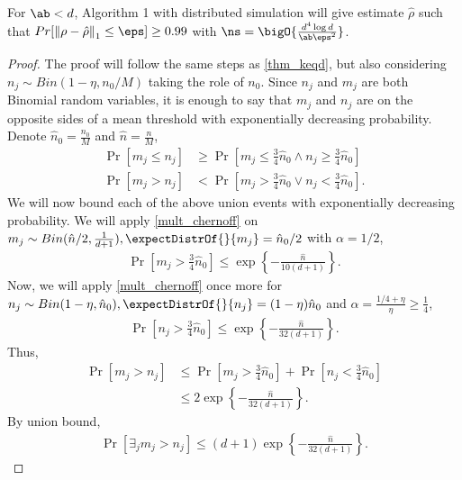 \begin{theorem}
\label{thm:k-outcome-tomography}
For $\ab < \dims$, Algorithm 1 with distributed simulation will give estimate $\hat{\rho}$ such that $Pr[\tracenorm{\rho-\hat{\rho}} \le \eps ]\ge 0.99$ with  $\ns = \bigO{\frac{\dims^4\log\dims}{\ab\eps^2}}$.
\end{theorem}
\begin{proof}
   The proof will follow the same steps as \cref{thm_keqd}, but also considering $n_j \sim Bin(1-\eta,n_0/M)$ taking the role of $n_0$. Since $n_j$ and $m_j$ are both Binomial random variables, it is enough to say that $m_j$ and $n_j$ are on the opposite sides of a mean threshold with exponentially decreasing probability. Denote $\hat{n}_0 = \frac{n_0}{M}$ and $\hat{n} = \frac{n}{M}$,
   \begin{align*}
       \Pr\left[m_j \leq n_j\right] &\geq \Pr\left[m_j \leq \frac{3}{4} \hat{n}_0 \land n_j \geq \frac{3}{4} \hat{n}_0\right] \\
       \Pr\left[m_j > n_j\right] &< \Pr\left[m_j > \frac{3}{4} \hat{n}_0 \lor n_j < \frac{3}{4} \hat{n}_0\right].
   \end{align*}
   We will now bound each of the above union events with exponentially decreasing probability. We will apply \cref{mult_chernoff} on $m_j \sim Bin(\hat{n}/2, \frac{1}{d+1}), \expectDistrOf{}{m_j} = \hat{n}_0/2$ with $\alpha = 1/2$,
   \begin{align*}
       \Pr\left[m_j > \frac{3}{4} \hat{n}_0\right] \leq \exp{\left\{- \frac{\hat{n}}{10(d+1)}\right\}}.
   \end{align*}
   Now, we will apply \cref{mult_chernoff} once more for $n_j \sim Bin(1-\eta,\hat{n}_0), \expectDistrOf{}{n_j} = (1-\eta) \hat{n}_0$ and $\alpha = \frac{1/4 + \eta}{\eta} \geq \frac{1}{4}$,
   \begin{align*}
          \Pr\left[n_j > \frac{3}{4} \hat{n}_0\right] \leq \exp{\left\{- \frac{\hat{n}}{32(d+1)}\right\}}.
   \end{align*}
   Thus, 
   \begin{align*}
       \Pr\left[m_j > n_j \right] &\leq \Pr\left[m_j > \frac{3}{4} \hat{n}_0 \right] + \Pr\left[n_j < \frac{3}{4} \hat{n}_0\right] \\
       &\leq 2 \exp{\left\{- \frac{\hat{n}}{32(d+1)}\right\}}.
   \end{align*}
   By union bound,
   \begin{align*}
       \Pr\left[\exists_j m_j > n_j \right] \leq (d+1) \exp{\left\{- \frac{\hat{n}}{32(d+1)}\right\}}.
   \end{align*}

\end{proof}
